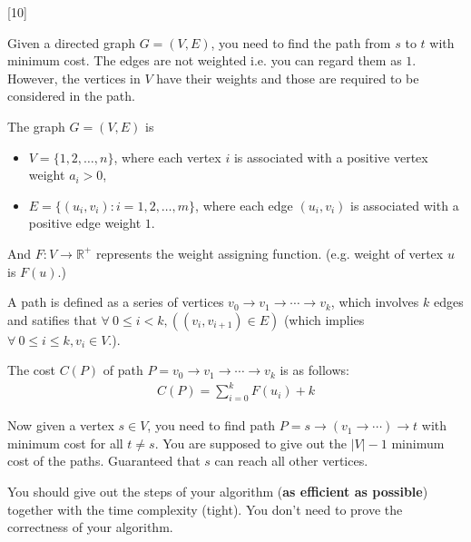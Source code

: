 [10]

Given a directed graph $G = (V, E)$, you need to find the path from $s$ to $t$ with minimum cost. The edges are not weighted i.e. you can regard them as $1$. However, the vertices in $V$ have their weights and those are required to be considered in the path.

The graph $G = (V, E)$ is
\begin{itemize}
    \item $V=\{1,2,\ldots, n\}$, where each vertex $i$ is associated with a positive vertex weight $a_i > 0$,
    \item $E=\{(u_i,v_i):i=1,2,\ldots, m\}$, where each edge $(u_i, v_i)$ is associated with a positive edge weight $1$.
\end{itemize}
And $F: V\to \mathbb{R}^+$ represents the weight assigning function. (e.g. weight of vertex $u$ is $F(u)$.)

A path is defined as a series of vertices $v_0\to v_1\to \cdots\to v_k$, which involves $k$ edges and satifies that $\forall\ 0\leq i <k, ((v_i,v_{i+1})\in E)$ (which implies $\forall\ 0\leq i \leq k, v_i\in V$.).

The cost $C(P)$ of path $P = v_0 \to v_1 \to \cdots \to v_k$ is as follows:
\begin{align*}
    C(P) = \sum_{i=0}^k F(u_i) + k
\end{align*}

Now given a vertex $s\in V$, you need to find path $P = s \to (v_1 \to \cdots ) \to t$ with minimum cost for all $t \not = s$.
You are supposed to give out the $|V|-1$ minimum cost of the paths. Guaranteed that $s$ can reach all other vertices.

You should give out the steps of your algorithm (\textbf{as efficient as possible}) together with the time complexity (tight). You don't need to prove the correctness of your algorithm.


